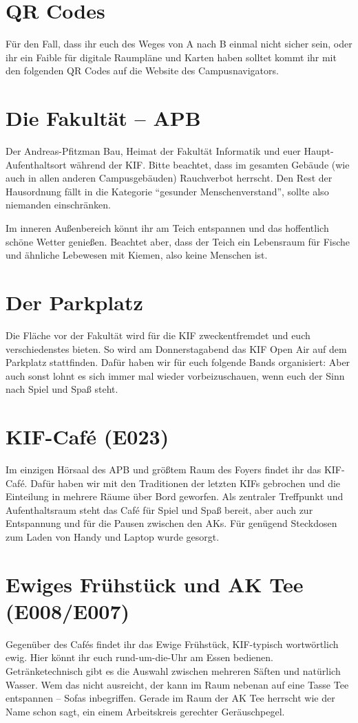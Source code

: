
\section*{QR Codes}
Für den Fall, dass ihr euch des Weges von A nach B einmal nicht sicher sein, oder ihr ein Faible für digitale Raumpläne und Karten haben solltet kommt ihr mit den folgenden QR Codes auf die Website des Campusnavigators.

\section*{Die Fakultät -- APB}
Der Andreas-Pfitzman Bau, Heimat der Fakultät Informatik und euer Haupt-Aufenthaltsort während der KIF\@.
Bitte beachtet, dass im gesamten Gebäude (wie auch in allen anderen Campusgebäuden) Rauchverbot herrscht.
Den Rest der Hausordnung fällt in die Kategorie \enquote{gesunder Menschenverstand}, sollte also niemanden einschränken.

Im inneren Außenbereich könnt ihr am Teich entspannen und das hoffentlich schöne Wetter genießen.
Beachtet aber, dass der Teich ein Lebensraum für Fische und ähnliche Lebewesen mit Kiemen, also keine Menschen ist.

\section*{Der Parkplatz}
Die Fläche vor der  Fakultät wird für die KIF zweckentfremdet und euch verschiedenstes bieten.  So wird am Donnerstagabend das KIF Open Air auf dem Parkplatz stattfinden. Dafür haben wir für euch folgende Bands organisiert:
Aber auch sonst lohnt es sich immer mal wieder vorbeizuschauen, wenn euch der Sinn nach Spiel und Spaß steht.

\section*{KIF-Café (E023)}
Im einzigen Hörsaal des APB und größtem Raum des Foyers findet ihr das KIF-Café.
Dafür haben wir mit den Traditionen der letzten KIFs gebrochen und die Einteilung in mehrere Räume über Bord geworfen.
Als zentraler Treffpunkt und Aufenthaltsraum steht das Café für Spiel und Spaß bereit, aber auch zur Entspannung und für die Pausen zwischen den AKs.
Für genügend Steckdosen zum Laden von Handy und Laptop wurde gesorgt.

\section*{Ewiges Frühstück und AK Tee (E008/E007)}
Gegenüber des Cafés findet ihr das Ewige Frühstück, KIF-typisch wortwörtlich ewig.
Hier könnt ihr euch rund-um-die-Uhr am Essen bedienen.
Getränketechnisch gibt es die Auswahl zwischen mehreren Säften und natürlich Wasser.
Wem das nicht ausreicht, der kann im Raum nebenan auf eine Tasse Tee entspannen -- Sofas inbegriffen.
Gerade im Raum der AK Tee herrscht wie der Name schon sagt, ein einem Arbeitskreis gerechter Geräuschpegel.

